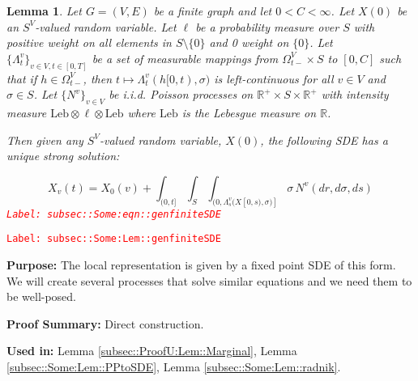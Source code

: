 \documentclass[12pt]{article}
\newcommand{\mb}{\mathbb}
\newcommand{\te}{\text}
\newcommand{\tr}{\textcolor{red}}
\newcommand{\labe}[1]{\tr{\texttt{Label: #1}}}
\newcommand{\purpose}{\textbf{Purpose: }}
\newcommand{\pfsum}{\textbf{Proof Summary: }}
\newcommand{\usein}{\textbf{Used in: }}
\newcommand{\ind}{\hspace{24pt}}
\renewcommand{\v}{v}							%
\renewcommand{\S}{S}							%
\newcommand{\s}{\sigma}							%
\newcommand{\T}{T}								%
\renewcommand{\t}{t}							%
\newcommand{\sset}{\Omega}						%
\renewcommand{\tt}{s}							%
\newcommand{\X}{X}								%
\newcommand{\vind}[1]{^{#1}}					%
\newcommand{\carp}[1]{^{#1}}					%
\newcommand{\vsi}[1]{^{#1}}						%
\newcommand{\cind}[1]{_{#1}}					%
\newcommand{\tp}[1]{(#1)}						%
\newcommand{\tip}[1]{#1}						%
\newcommand{\ts}[1]{_{#1}}						%
\newcommand{\const}{C}							%
\newcommand{\poiss}{N}							%
\newcommand{\leb}{\te{Leb}}						%
\newcommand{\Sm}{\ell}							%
\renewcommand{\r}{r}							%
\newcommand{\ratee}{\Lambda}					%
\newtheorem{lem}[thms]{Lemma}
\begin{document}
\begin{lem}
Let \(G = (V,E)\) be a finite graph and let \(0 < \const< \infty\). Let \(\X\tp{0}\) be an \(\S\carp{V}\)-valued random variable. Let \(\Sm\) be a probability measure over \(\S\) with positive weight on all elements in \(\S\setminus\{0\}\) and 0 weight on \(\{0\}\). Let \(\{\ratee\ts{\t}\vind{\v}\}_{\v \in V,\t\in [0,\T]}\) be a set of measurable mappings from \(\sset\vsi{V}\ts{\t-} \times \S\) to \([0,\const]\) such that if \(h \in \sset\vsi{V}\ts{\t-}\), then \(\t\mapsto \ratee\ts{\t}\vind{\v}(h[0,\t),\s)\) is left-continuous for all \(\v \in V\) and \(\s \in \S\). Let \(\{\poiss\vind{\v}\}_{\v \in V}\) be i.i.d. Poisson processes on \(\mb{R}^+\times \S\times\mb{R}^+\) with intensity measure \(\leb\otimes\Sm\otimes\leb\) where \(\leb\) is the Lebesgue measure on \(\mb{R}\).

\ind Then given any \(\S\carp{V}\)-valued random variable, \(\X\tp{0}\), the following SDE has a unique strong solution:

\begin{equation}
\X\cind{\v}\tp{\t} = \X\cind{0}\tp{\v} + \int_{(0,\t]}\int_\S\int_{(0,\ratee\ts{\tt}\vind{\v}(\X\tip{[0,\tt)},\s)]}  \s\,\poiss\vind{\v}(d\r,d\s,d\tt)
\label{subsec::Some:eqn::genfiniteSDE}
\end{equation}
\labe{subsec::Some:eqn::genfiniteSDE}
\label{subsec::Some:Lem::genfiniteSDE}
\end{lem}
\labe{subsec::Some:Lem::genfiniteSDE}

\purpose The local representation is given by a fixed point SDE of this form. We will create several processes that solve similar equations and we need them to be well-posed.

\pfsum Direct construction.

\usein Lemma \ref{subsec::ProofU:Lem::Marginal}, Lemma \ref{subsec::Some:Lem::PPtoSDE}, Lemma \ref{subsec::Some:Lem::radnik}.
\end{document}
